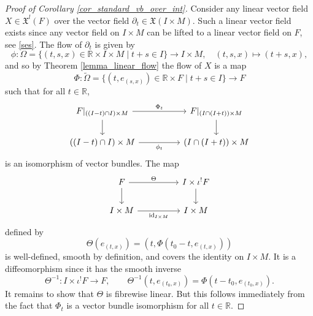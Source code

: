 \documentclass{amsart}
\theoremstyle{plain}
\newcommand{\mx}{\mathfrak{X}}
\DeclareMathOperator {\id}    {id}
\begin{document}
\begin{proof}[Proof of Corollary \ref{cor_standard_vb_over_int}]
Consider any linear vector field $X\in\mx^l(F)$ over the vector field $\partial_t\in\mx(I\times M)$. Such a linear vector field exists since any vector field on $I\times M$ can be lifted to a linear vector field on $F$, see \eqref{ses}.
The flow of $\partial_t$ is given by 
\[ \phi\colon\Omega=\{(t,s,x)\in \mathbb R\times I\times M\mid t+s\in I\}\to I\times M, \quad (t,s,x)\mapsto (t+s,x),
\]
and so by Theorem \ref{lemma_linear_flow} the flow of $X$ is a map
\[ \Phi\colon \widetilde \Omega=\{(t,e_{(s,x)})\in \mathbb R\times F\mid t+s\in I\}\to F
\]
such that for all $t\in \mathbb R$, 
\[\begin{tikzcd}
	{F\arrowvert_{((I-t)\cap I)\times M}} && {F\arrowvert_{(I\cap (I+t))\times M}} \\
	{((I-t)\cap I)\times M} && {(I\cap (I+t))\times M}
	\arrow["{\Phi_t}", from=1-1, to=1-3]
	\arrow[from=1-1, to=2-1]
	\arrow[from=1-3, to=2-3]
	\arrow["{\phi_t}"', from=2-1, to=2-3]
\end{tikzcd}\]
is an isomorphism of vector bundles.
 The map 
\[\begin{tikzcd}
	F && {I\times \iota^!F} \\
	{I\times M} && {I\times M}
	\arrow["\Theta", from=1-1, to=1-3]
	\arrow[from=1-1, to=2-1]
	\arrow[from=1-3, to=2-3]
	\arrow["{\id_{I\times M}}"', from=2-1, to=2-3]
\end{tikzcd}\]
defined 
by 
\[ \Theta(e_{(t,x)})=\left(t, \Phi(t_0-t, e_{(t,x)})\right)
\]
is well-defined, smooth by definition, and covers the identity on $I\times M$. It is a diffeomorphism since it has the smooth inverse
\[ \Theta^{-1}\colon I\times \iota^!F\to F, \qquad \Theta^{-1}(t, e_{(t_0,x)})=\Phi(t-t_0, e_{(t_0,x)}).
\]
It remains to show that $\Theta$ is fibrewise linear. But this follows immediately from the fact that $\Phi_t$ is a vector bundle isomorphism for all $t\in\mathbb R$.
\end{proof}
\end{document}

